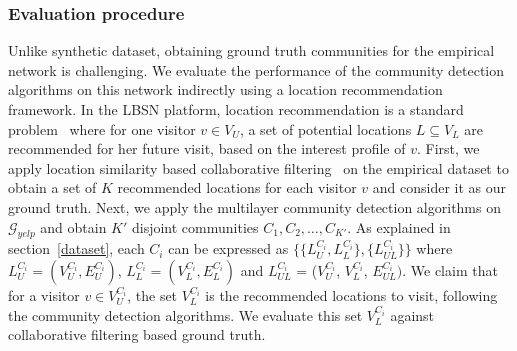 \subsubsection{Evaluation procedure}
Unlike synthetic dataset, obtaining ground truth communities for the empirical network is challenging.
We evaluate the performance of the community detection algorithms on this network indirectly using a location recommendation framework.
In the LBSN platform, location recommendation is a standard problem~\cite{gupta2015complementary} where for one visitor $v \in V_U$, a
set of potential
locations $L \subseteq V_L$ are recommended for her future visit, based on the interest profile of $v$.
First, we apply location similarity based collaborative filtering~\cite{resnick1994grouplens} on the empirical dataset to obtain a set
of $K$ recommended locations for each visitor $v$ and consider it as our ground truth.
Next, we apply the multilayer community detection algorithms on $\mathcal{G}_{yelp}$ and obtain $K'$ disjoint
communities $C_1, C_2,\dots,C_{K'}$. As explained in section~\ref{dataset}, each $C_i$ can be expressed as
$\{\{L^{C_i}_U, L^{C_i}_L\},\{L^{C_i}_{UL}\}\}$ where $L^{C_i}_U = (V^{C_i}_U, E^{C_i}_U)$,
$L^{C_i}_L = (V^{C_i}_L, E^{C_i}_L)$ and $L^{C_i}_{UL}$ = ($V^{C_i}_U$, $V^{C_i}_L$, $E^{C_i}_{UL})$.
We claim that for a visitor $v \in V^{C_i}_U$, the set $V^{C_i}_L$ is the recommended locations to visit,
following the community detection algorithms.
We evaluate this set $V^{C_i}_L$ against collaborative filtering based ground truth.

